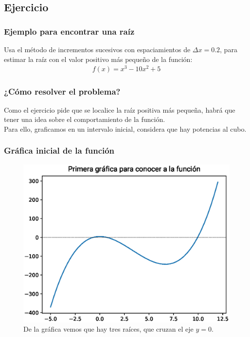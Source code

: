 \documentclass[12pt]{beamer}
\begin{document}
\subsection{Ejercicio}

\begin{frame}
\frametitle{Ejemplo para encontrar una raíz}
Usa el método de incrementos sucesivos con espaciamientos de $\Delta x = 0.2$, para estimar la raíz con el valor positivo más pequeño de la función:
\pause
\begin{align*}
f (x) = x^{3} - 10 x^{2} + 5
\end{align*}
\end{frame}
\begin{frame}
\frametitle{¿Cómo resolver el problema?}
Como el ejercicio pide que se localice la raíz positiva más pequeña, habrá que tener una idea sobre el comportamiento de la función.
\\
\bigskip
\pause
Para ello, graficamos en un intervalo inicial, considera que hay potencias al cubo.
\end{frame}
\begin{frame}
\frametitle{Gráfica inicial de la función}
\begin{figure}
	\centering
	\includegraphics[scale=0.5]{Imagenes/aprox_sucesivas_01.eps}
	\caption{De la gráfica vemos que hay tres raíces, que cruzan el eje $y = 0$.} 
\end{figure}
\end{frame}
\end{document}
